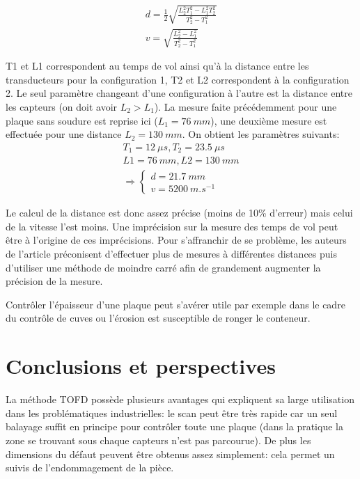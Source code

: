 \documentclass[twoside]{article}
\begin{document}
\begin{multicols}{2}
\begin{eqnarray}
d = \frac{1}{2} \sqrt{ \frac{L_2^2 T_1^2 - L_1^2 T_2^2}{T_2^2	- T_1^2}} \\
v = \sqrt{\frac{L_2^2 - L_1^2}{T_2^2 - T_1^2}}
\end{eqnarray}

T1 et L1 correspondent au temps de vol ainsi qu'à la distance entre les transducteurs pour la configuration 1, T2 et L2 correspondent à la configuration 2. Le seul paramètre changeant d'une configuration à l'autre est la distance entre les capteurs (on doit avoir $L_2 > L_1$). La mesure faite précédemment pour une plaque sans soudure est reprise ici ($L_1 = 76~mm$), une deuxième mesure est effectuée pour une distance $L_2 = 130~ mm$. On obtient les paramètres suivants:
\begin{eqnarray}
T_1 = 12 ~\mu s , T_2 = 23.5~ \mu s \\
L1 = 76~mm , L2 = 130~ mm \\
\Rightarrow \left\{\begin{matrix}
d = 21.7~ mm\\
 v= 5200~m.s^{-1}
\end{matrix}\right. 
\end{eqnarray}

Le calcul de la distance est donc assez précise (moins de 10\% d'erreur) mais celui de la vitesse l'est moins. Une imprécision sur la mesure des temps de vol peut être à l'origine de ces imprécisions. Pour s'affranchir de se problème, les auteurs de l'article préconisent d'effectuer plus de mesures à différentes distances puis d'utiliser une méthode de moindre carré afin de grandement augmenter la précision de la mesure.

Contrôler l'épaisseur d'une plaque peut s'avérer utile par exemple dans le cadre du contrôle de cuves ou l'érosion est susceptible de ronger le conteneur.





\section{Conclusions et perspectives}
La méthode TOFD possède plusieurs avantages qui expliquent sa large utilisation dans les problématiques industrielles: le scan peut être très rapide car un seul balayage suffit en principe pour contrôler toute une plaque (dans la pratique la zone se trouvant sous chaque capteurs n'est pas parcourue). De plus les dimensions du défaut peuvent être obtenus assez simplement: cela permet un suivis de l'endommagement de la pièce.


\end{multicols}
\end{document}
